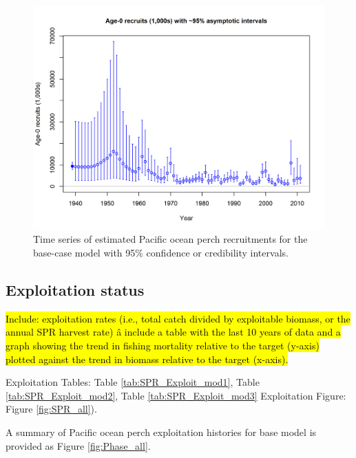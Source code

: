 \documentclass[12pt,]{article}
\begin{document}
\FloatBarrier

\begin{figure}
\centering
\includegraphics{r4ss/plots_mod1/ts11_Age-0_recruits_(1000s)_with_95_asymptotic_intervals.png}
\caption{Time series of estimated Pacific ocean perch recruitments for
the base-case model with 95\% confidence or credibility intervals.
\label{fig:Recruits_all}}
\end{figure}

\FloatBarrier

\subsection*{Exploitation status}\label{exploitation-status}

\hl{Include: exploitation rates (i.e., total catch divided by exploitable biomass, or the annual SPR harvest rate) â include a table with the last 10 years of data and a graph showing the trend in fishing mortality relative to the target (y-axis) plotted against the trend in biomass relative to the target (x-axis).}

Exploitation Tables: Table \ref{tab:SPR_Exploit_mod1}, Table
\ref{tab:SPR_Exploit_mod2}, Table \ref{tab:SPR_Exploit_mod3}
Exploitation Figure: Figure \ref{fig:SPR_all}).

A summary of Pacific ocean perch exploitation histories for base model
is provided as Figure \ref{fig:Phase_all}.

\FloatBarrier
\end{document}
